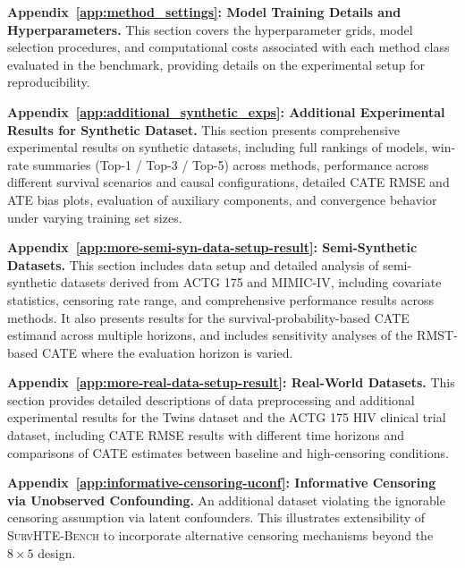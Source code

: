 \documentclass{article} %
\begin{document}
\textbf{Appendix~\ref{app:method_settings}: Model Training Details and Hyperparameters.}
This section covers the hyperparameter grids, model selection procedures, and computational costs associated with each method class evaluated in the benchmark, providing details on the experimental setup for reproducibility.

\textbf{Appendix~\ref{app:additional_synthetic_exps}: Additional Experimental Results for Synthetic Dataset.}
This section presents comprehensive experimental results on synthetic datasets, including full rankings of models, win-rate summaries (Top-1 / Top-3 / Top-5) across methods, performance across different survival scenarios and causal configurations, detailed CATE RMSE and ATE bias plots, evaluation of auxiliary components, and convergence behavior under varying training set sizes.

\textbf{Appendix~\ref{app:more-semi-syn-data-setup-result}: Semi-Synthetic Datasets.}  
This section includes data setup and detailed analysis of semi-synthetic datasets derived from ACTG 175 and MIMIC-IV, including covariate statistics, censoring rate range, and comprehensive performance results across methods. It also presents results for the survival-probability-based CATE estimand across multiple horizons, and includes sensitivity analyses of the RMST-based CATE where the evaluation horizon is varied.

\textbf{Appendix~\ref{app:more-real-data-setup-result}: Real-World Datasets.}
This section provides detailed descriptions of data preprocessing and additional experimental results for the Twins dataset and the ACTG 175 HIV clinical trial dataset, including CATE RMSE results with different time horizons and comparisons of CATE estimates between baseline and high-censoring conditions.

\textbf{Appendix~\ref{app:informative-censoring-uconf}: Informative Censoring via Unobserved Confounding.}
An additional dataset violating the ignorable censoring assumption via latent confounders. This illustrates extensibility of \textsc{SurvHTE-Bench} to incorporate alternative censoring mechanisms beyond the $8 \times 5$ design.


\end{document}
